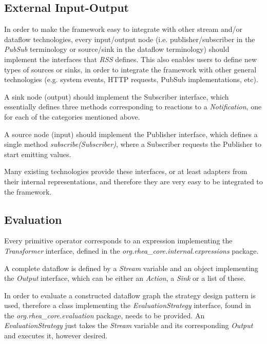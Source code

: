 \documentclass[sigplan,review,anonymous]{acmart}\settopmatter{printfolios=true}
\begin{document}
\subsection{External Input-Output} \label{external}
In order to make the framework easy to integrate with other stream and/or dataflow technologies, every input/output node (i.e. publisher/subscriber in the \textit{PubSub} terminology or source/sink in the dataflow terminology) should implement the interfaces that \textit{RSS} defines. This also enables users to define new types of sources or sinks, in order to integrate the framework with other general technologies (e.g. system events, HTTP requests, PubSub implementations, etc).

A sink node (output) should implement the Subscriber interface, which essentially defines three methods corresponding to reactions to a \textit{Notification}, one for each of the categories mentioned above. 

A source node (input) should implement the Publisher interface, which defines a single method \textit{subscribe(Subscriber)}, where a Subscriber requests the Publisher to start emitting values. 

Many existing technologies provide these interfaces, or at least adapters from their internal representations, and therefore they are very easy to be integrated to the framework.

\subsection{Evaluation}

Every primitive operator corresponds to an expression implementing the \textit{Transformer} interface, defined in the \textit{org.rhea\_core.internal.expressions} package. 

A complete dataflow is defined by a \textit{Stream} variable and an object implementing the \textit{Output} interface, which can be either an \textit{Action}, a \textit{Sink} or a list of these. 

In order to evaluate a constructed dataflow graph the strategy design pattern is used, therefore a class implementing the \textit{EvaluationStrategy} interface, found in the \textit{org.rhea\_core.evaluation} package, needs to be provided. An \textit{EvaluationStrategy} just takes the \textit{Stream} variable and its corresponding \textit{Output} and executes it, however desired.
\end{document}
